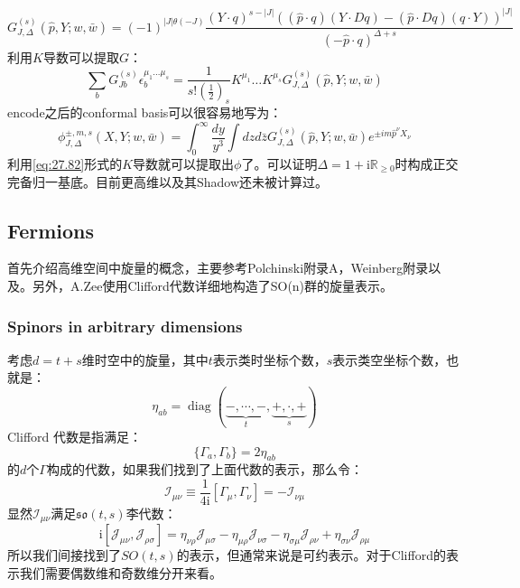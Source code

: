 \begin{equation}
	G_{J,\Delta}^{(s)}(\hat{p},Y;w,\bar{w})=(-1)^{|J|\theta(-J)}\frac{(Y\cdot q)^{s-|J|}((\hat{p}\cdot q)(Y\cdot Dq)-(\hat{p}\cdot Dq)(q\cdot Y))^{|J|}}{(-\hat{p}\cdot q)^{\Delta+s}}
\end{equation}
利用$K$导数可以提取$G$：
\begin{equation}\label{eq:27.82}
	\sum_bG_{Jb}^{(s)}\epsilon_b^{\mu_1...\mu_s}=\frac{1}{s!(\frac{1}{2})_s}K^{\mu_1}\ldots K^{\mu_s}G_{J,\Delta}^{(s)}(\hat{p},Y;w,\bar{w})
\end{equation}
encode之后的conformal basis可以很容易地写为：
\begin{equation}
	\phi_{J,\Delta}^{\pm,m,s}(X,Y;w,\bar{w})=\int_0^\infty\frac{dy}{y^3}\int dzd\bar{z}G_{J,\Delta}^{(s)}(\hat{p},Y;w,\bar{w})e^{\pm im\hat{p}^\nu X_\nu}
\end{equation}
利用\ref{eq:27.82}形式的$K$导数就可以提取出$\phi$了。可以证明$\boxed{\Delta=1+\mathrm{i}\mathbb{R}_{\geq 0}}$时构成正交完备归一基底。目前更高维以及其Shadow还未被计算过。
\subsection{Fermions}
首先介绍高维空间中旋量的概念，主要参考Polchinski\cite{Polchinski:1998rr}附录A，Weinberg\cite{Weinberg:2000cr}附录以及\cite{VanProeyen:1999ni}。另外，A.Zee\cite{A.Zee}使用Clifford代数详细地构造了SO(n)群的旋量表示。
\subsubsection{Spinors in arbitrary dimensions}
考虑$d=t+s$维时空中的旋量，其中$t$表示类时坐标个数，$s$表示类空坐标个数，也就是：
\begin{equation}
	\eta_{ab}=\operatorname{diag}(\underbrace{-,\cdots,-}_{t},\underbrace{+,\cdot,+}_{s})
\end{equation}
Clifford 代数是指满足：
\begin{equation}
	\{\Gamma_a,\Gamma_b\}=2\eta_{ab}
\end{equation}
的$d$个$\Gamma$构成的代数，如果我们找到了上面代数的表示，那么令：
\begin{equation}
	\mathscr{I}_{\mu\nu}\equiv\frac{1}{4\mathrm{i}}[\Gamma_{\mu},\Gamma_{\nu}]=-\mathscr{I}_{\nu\mu}
\end{equation}
显然$\mathscr{I}_{\mu\nu}$满足$\mathfrak{so}(t,s)$李代数：
\begin{equation}
	\text{i}[\mathscr{J}_{\mu\nu},\mathscr{J}_{\rho\sigma}]=\eta_{\nu\rho}\mathscr{J}_{\mu\sigma}-\eta_{\mu\rho}\mathscr{J}_{\nu\sigma}-\eta_{\sigma\mu}\mathscr{J}_{\rho\nu}+\eta_{\sigma\nu}\mathscr{J}_{\rho\mu}
\end{equation}
所以我们间接找到了$SO(t,s)$的表示，但通常来说是可约表示。对于Clifford的表示我们需要偶数维和奇数维分开来看。

